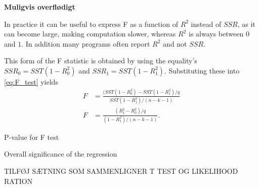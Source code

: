 \textbf{Muligvis overflødigt}

In practice it can be useful to express F as a function of $R^2$ instead of $SSR$, as it can become large, making computation slower, whereas $R^2$ is always between $0$ and $1$. In addition many programs often report $R^2$ and not $SSR$.

This form of the F statistic is obtained by using the equality's $SSR_0 = SST(1 - R^2_0)$ and $SSR_1 = SST(1-R^2_1)$. Substituting these into \eqref{eq:F_test} yields
\begin{align}\label{eq:F_test_R}
    F &= \frac{(SST(1 - R^2_0) - SST(1-R^2_1)/q}{SST(1-R^2_1)/(n-k-1)} \nonumber \\
    F &= \frac{(R^2_1 - R^2_0)/q}{(1 - R^2_1)/(n-k-1)}.
\end{align}



P-value for F test

Overall significance of the regression

TILFØJ SÆTNING SOM SAMMENLIGNER T TEST OG LIKELIHOOD RATION





